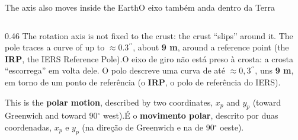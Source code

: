 \documentclass[aspectratio=169,11pt]{beamer}
\newcommand{\tr}[2]{\ifEN#2\else#1\fi}
\newcommand{\bnum}[1]{\textbf{\textcolor{mTeal}{#1}}}
\newcommand{\asec}{\ensuremath{{}^{\prime\prime}}}
\newcommand{\gr}{\ensuremath{{}^{\circ}}}
\begin{document}
\begin{frame}{\tr{O eixo também anda dentro da Terra}{The axis also moves inside the Earth}}
  \begin{columns}[T]
    \begin{column}{0.46\textwidth}
      \small
      \tr{O eixo de giro não está preso à crosta: a crosta ``escorrega'' em volta dele. O polo descreve uma curva de até $\approx 0{,}3\asec$, uns \bnum{9 m}, em torno de um ponto de referência (o \bnum{IRP}, o polo de referência do IERS).}{The rotation axis is not fixed to the crust: the crust ``slips'' around it. The pole traces a curve of up to $\approx 0.3\asec$, about \bnum{9 m}, around a reference point (the \bnum{IRP}, the IERS Reference Pole).}
      \medskip

      \tr{É o \bnum{movimento polar}, descrito por duas coordenadas, $x_p$ e $y_p$ (na direção de Greenwich e na de $90\gr$ oeste).}{This is the \bnum{polar motion}, described by two coordinates, $x_p$ and $y_p$ (toward Greenwich and toward $90\gr$ west).}
      \medskip


\end{column}
\end{columns}
\end{frame}
\end{document}
